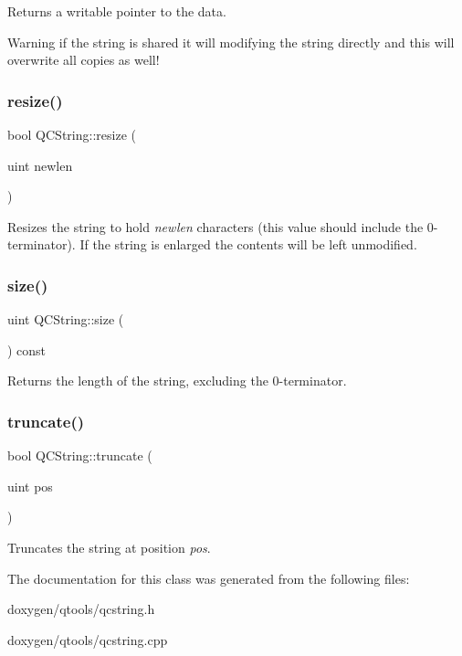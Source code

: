 Returns a writable pointer to the data. \begin{DoxyWarning}{Warning}
if the string is shared it will modifying the string directly and this will overwrite all copies as well! 
\end{DoxyWarning}
\mbox{\label{class_q_c_string_a8402bb62a3a1c6a79130c3b3cf38b52c}} 
\subsubsection{\texorpdfstring{resize()}{resize()}}
{\footnotesize\ttfamily bool Q\+C\+String\+::resize (\begin{DoxyParamCaption}\item[{uint}]{newlen }\end{DoxyParamCaption})\hspace{0.3cm}{\ttfamily [inline]}}

Resizes the string to hold {\itshape newlen} characters (this value should include the 0-\/terminator). If the string is enlarged the contents will be left unmodified. \mbox{\label{class_q_c_string_ac084f55ab51f8b277cf01bb6e04f16ed}} 
\subsubsection{\texorpdfstring{size()}{size()}}
{\footnotesize\ttfamily uint Q\+C\+String\+::size (\begin{DoxyParamCaption}{ }\end{DoxyParamCaption}) const\hspace{0.3cm}{\ttfamily [inline]}}

Returns the length of the string, excluding the 0-\/terminator. \mbox{\label{class_q_c_string_a5644b56f807df5375dba545abca25f40}} 
\subsubsection{\texorpdfstring{truncate()}{truncate()}}
{\footnotesize\ttfamily bool Q\+C\+String\+::truncate (\begin{DoxyParamCaption}\item[{uint}]{pos }\end{DoxyParamCaption})\hspace{0.3cm}{\ttfamily [inline]}}

Truncates the string at position {\itshape pos}. 

The documentation for this class was generated from the following files\+:\begin{DoxyCompactItemize}
\item 
doxygen/qtools/qcstring.\+h\item 
doxygen/qtools/qcstring.\+cpp\end{DoxyCompactItemize}
